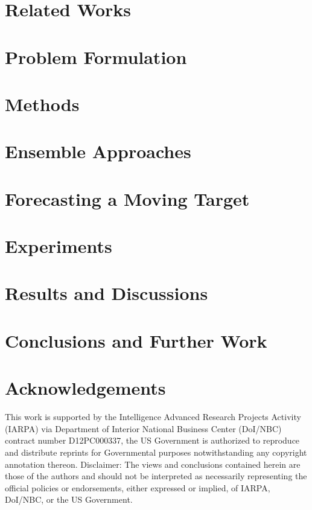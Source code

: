 \documentclass[twoside,leqno,twocolumn]{article}
\begin{document}
\section{\label{sec:related}Related Works}


\section{\label{sec:problem} Problem Formulation}

 
\section{\label{sec:methods} Methods}


\section{\label{sec:ensemble} Ensemble Approaches}


\section{\label{sec:moving} Forecasting a Moving Target}


\section{\label{sec:experiments} Experiments}


\section{\label{sec:results} Results and Discussions}


\section{\label{sec:conclusions} Conclusions and Further Work}


\section*{Acknowledgements}
This work is supported by the Intelligence Advanced Research Projects Activity
(IARPA) via Department of Interior National Business Center (DoI/NBC)
contract number D12PC000337, the US Government is authorized to
reproduce and distribute reprints for Governmental purposes
notwithstanding any copyright annotation thereon. Disclaimer: The
views and conclusions contained herein are those of the authors and
should not be interpreted as necessarily representing the official
policies or endorsements, either expressed or implied, of IARPA,
DoI/NBC, or the US Government.
\end{document}
